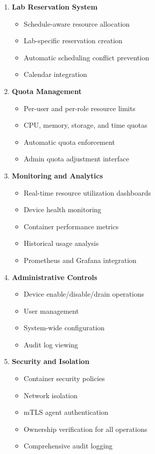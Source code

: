 \documentclass[12pt,a4paper]{article}
\begin{document}
\begin{enumerate}
    \item \textbf{Lab Reservation System}
    \begin{itemize}
        \item Schedule-aware resource allocation
        \item Lab-specific reservation creation
        \item Automatic scheduling conflict prevention
        \item Calendar integration
    \end{itemize}
    
    \item \textbf{Quota Management}
    \begin{itemize}
        \item Per-user and per-role resource limits
        \item CPU, memory, storage, and time quotas
        \item Automatic quota enforcement
        \item Admin quota adjustment interface
    \end{itemize}
    \item \textbf{Monitoring and Analytics}
    \begin{itemize}
        \item Real-time resource utilization dashboards
        \item Device health monitoring
        \item Container performance metrics
        \item Historical usage analysis
        \item Prometheus and Grafana integration
    \end{itemize}
    
    \item \textbf{Administrative Controls}
    \begin{itemize}
        \item Device enable/disable/drain operations
        \item User management
        \item System-wide configuration
        \item Audit log viewing
    \end{itemize}
    
    \item \textbf{Security and Isolation}
    \begin{itemize}
        \item Container security policies
        \item Network isolation
        \item mTLS agent authentication
        \item Ownership verification for all operations
        \item Comprehensive audit logging
    \end{itemize}
\end{enumerate}
\end{document}
